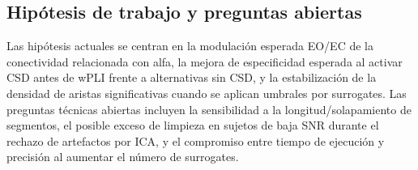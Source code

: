 \subsection{Hipótesis de trabajo y preguntas abiertas}

Las hipótesis actuales se centran en la modulación esperada EO/EC de la conectividad relacionada con alfa, la mejora de especificidad esperada al activar CSD antes de wPLI frente a alternativas sin CSD, y la estabilización de la densidad de aristas significativas cuando se aplican umbrales por surrogates. Las preguntas técnicas abiertas incluyen la sensibilidad a la longitud/solapamiento de segmentos, el posible exceso de limpieza en sujetos de baja SNR durante el rechazo de artefactos por ICA, y el compromiso entre tiempo de ejecución y precisión al aumentar el número de surrogates.
